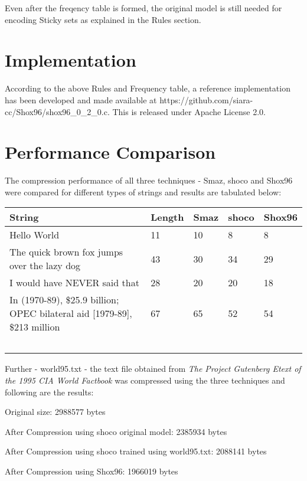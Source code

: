 \documentclass[]{article}
\begin{document}
Even after the freqency table is formed, the original model is still needed for encoding Sticky sets as explained in the Rules section.

\section{Implementation}

According to the above Rules and Frequency table, a reference implementation has been developed and made available at https://github.com/siara-cc/Shox96/shox96\_0\_2\_0.c.  This is released under Apache License 2.0.

\section{Performance Comparison}

The compression performance of all three techniques - Smaz, shoco and Shox96 were compared for different types of strings and results are tabulated below:

\begin{center}
\begin{tabular}{ | p{} | p{} | p{} | p{} | p{} |} \hline
﻿\textbf{String} & ﻿\textbf{Length} & ﻿\textbf{Smaz} & ﻿\textbf{shoco} & ﻿\textbf{Shox96} \\ \hline
Hello World & 11 & 10 & 8 & 8 \\ \hline
The quick brown fox jumps over the lazy dog & 43 & 30 & 34 & 29 \\ \hline
I would have NEVER said that & 28 & 20 & 20 & 18 \\ \hline
In (1970-89), \$25.9 billion; OPEC bilateral aid [1979-89], \$213 million & 67 & 65 & 52 & 54 \\ \hline
	﻿\end{tabular}
\end{center}

Further - world95.txt - the text file obtained from \emph{The Project Gutenberg Etext of the 1995 CIA World Factbook} was compressed using the three techniques and following are the results:

Original size: 2988577 bytes

After Compression using shoco original model: 2385934 bytes

After Compression using shoco trained using world95.txt: 2088141 bytes

After Compression using Shox96: 1966019 bytes
\end{document}

